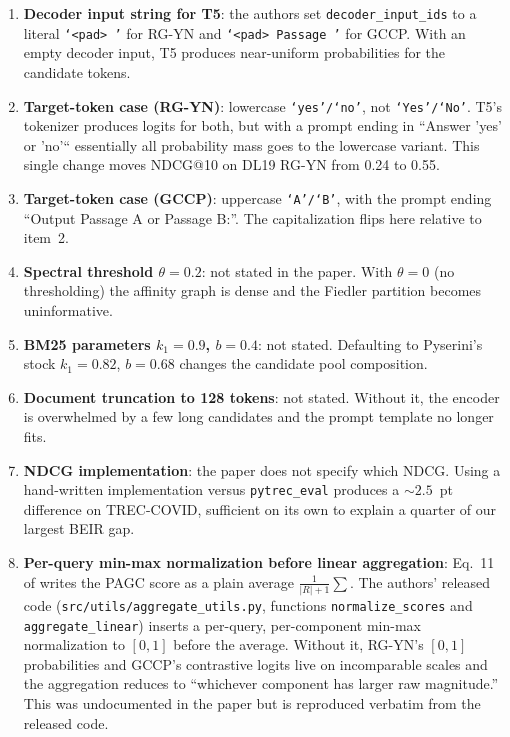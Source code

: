 \documentclass[sigconf]{acmart}
\begin{document}
\begin{enumerate}[leftmargin=1.5em,nosep]
    \item \textbf{Decoder input string for T5}: the authors set
          \texttt{decoder\_input\_ids} to a literal \texttt{`<pad> '}
          for RG-YN and \texttt{`<pad> Passage '} for GCCP. With an
          empty decoder input, T5 produces near-uniform probabilities
          for the candidate tokens.

    \item \textbf{Target-token case (RG-YN)}: lowercase
          \texttt{`yes'/`no'}, not \texttt{`Yes'/`No'}. T5's
          tokenizer produces logits for both, but with a prompt
          ending in ``Answer 'yes' or 'no'`` essentially all
          probability mass goes to the lowercase variant. This single
          change moves NDCG@10 on DL19 RG-YN from 0.24 to 0.55.

    \item \textbf{Target-token case (GCCP)}: uppercase
          \texttt{`A'/`B'}, with the prompt ending ``Output Passage A
          or Passage B:''. The capitalization flips here relative to
          item~2.

    \item \textbf{Spectral threshold $\theta = 0.2$}: not stated in
          the paper. With $\theta = 0$ (no thresholding) the affinity
          graph is dense and the Fiedler partition becomes uninformative.

    \item \textbf{BM25 parameters $k_1{=}0.9$, $b{=}0.4$}: not stated.
          Defaulting to Pyserini's stock $k_1{=}0.82$, $b{=}0.68$
          changes the candidate pool composition.

    \item \textbf{Document truncation to 128 tokens}: not stated. Without
          it, the encoder is overwhelmed by a few long candidates and
          the prompt template no longer fits.

    \item \textbf{NDCG implementation}: the paper does not specify
          which NDCG. Using a hand-written implementation versus
          \texttt{pytrec\_eval} produces a $\sim 2.5$~pt difference on
          TREC-COVID, sufficient on its own to explain a quarter of
          our largest BEIR gap.

    \item \textbf{Per-query min-max normalization before linear
          aggregation}: Eq.~11 of \cite{long2025precise} writes the
          PAGC score as a plain average $\tfrac{1}{|R|+1}\sum$. The
          authors' released code (\texttt{src/utils/aggregate\_utils.py},
          functions \texttt{normalize\_scores} and
          \texttt{aggregate\_linear}) inserts a per-query, per-component
          min-max normalization to $[0,1]$ before the average. Without
          it, RG-YN's $[0,1]$ probabilities and GCCP's contrastive logits
          live on incomparable scales and the aggregation reduces to
          ``whichever component has larger raw magnitude.'' This was
          undocumented in the paper but is reproduced verbatim from the
          released code.
\end{enumerate}
\end{document}
